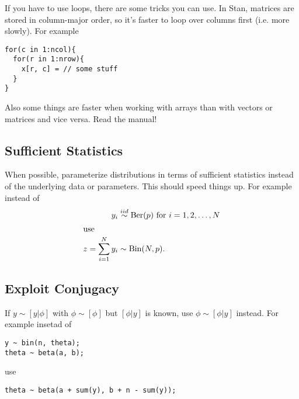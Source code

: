 \documentclass{article}
\begin{document}
If you have to use loops, there are some tricks you can use. In Stan, matrices are stored in column-major order, so it's faster to loop over columns first (i.e. more slowly). For example
\begin{verbatim}
for(c in 1:ncol){
  for(r in 1:nrow){
    x[r, c] = // some stuff
  }
}
\end{verbatim}

Also some things are faster when working with arrays than with vectors or matrices and vice versa. Read the manual!

\subsection{Sufficient Statistics}
When possible, parameterize distributions in terms of sufficient statistics instead of the underlying data or parameters. This should speed things up. For example instead of
\begin{align*}
y_i &\stackrel{iid}{\sim}\mathrm{Ber}(p) \mbox{ for } i=1,2,\dots,N\\
\intertext{use}
z = \sum_{i=1}^Ny_i &\sim \mathrm{Bin}(N, p).
\end{align*}

\subsection{Exploit Conjugacy}
If $y\sim[y|\phi]$ with $\phi\sim[\phi]$ but $[\phi|y]$ is known, use $\phi \sim [\phi|y]$ instead. For example insetad of
\begin{verbatim}
y ~ bin(n, theta);
theta ~ beta(a, b);
\end{verbatim}
use
\begin{verbatim}
theta ~ beta(a + sum(y), b + n - sum(y));
\end{verbatim}
\end{document}
